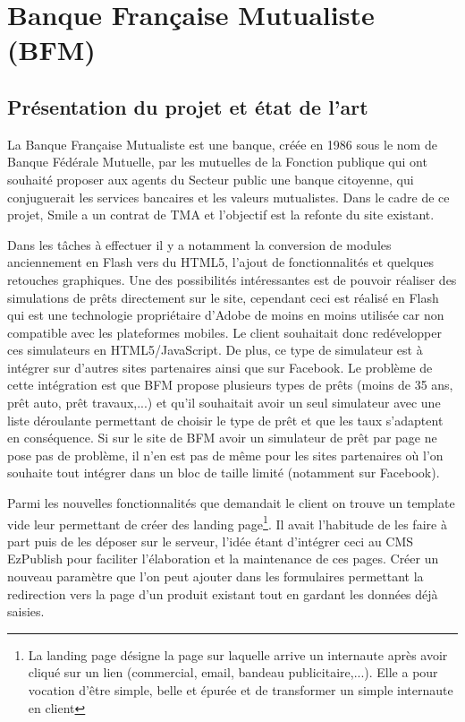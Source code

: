 \documentclass[a4paper,11pt,twoside]{report}
\begin{document}
\newpage
    
  \section{Banque Française Mutualiste (BFM)}
    \subsection*{Présentation du projet et état de l'art}
    La Banque Française Mutualiste est une banque, créée en 1986 sous le nom de Banque Fédérale Mutuelle, par les mutuelles de la Fonction publique qui ont souhaité proposer aux agents du Secteur public une banque citoyenne, qui conjuguerait les services bancaires et les valeurs mutualistes. Dans le cadre de ce projet, Smile a un contrat de TMA et l'objectif est la refonte du site existant. 
    
    Dans les tâches à effectuer il y a notamment la conversion de modules anciennement en Flash vers du HTML5, l'ajout de fonctionnalités et quelques retouches graphiques. Une des possibilités intéressantes est de pouvoir réaliser des simulations de prêts directement sur le site, cependant ceci est réalisé en Flash qui est une technologie propriétaire d'Adobe de moins en moins utilisée car non compatible avec les plateformes mobiles. Le client souhaitait donc redévelopper ces simulateurs en HTML5/JavaScript. De plus, ce type de simulateur est à intégrer sur d'autres sites partenaires ainsi que sur Facebook. Le problème de cette intégration est que BFM propose plusieurs types de prêts (moins de 35 ans, prêt auto, prêt travaux,...) et qu'il souhaitait avoir un seul simulateur avec une liste déroulante permettant de choisir le type de prêt et que les taux s'adaptent en conséquence. Si sur le site de BFM avoir un simulateur de prêt par page ne pose pas de problème, il n'en est pas de même pour les sites partenaires où l'on souhaite tout intégrer dans un bloc de taille limité (notamment sur Facebook). 
    
    Parmi les nouvelles fonctionnalités que demandait le client on trouve un template vide leur permettant de créer des landing page\footnote{La landing page désigne la page sur laquelle arrive un internaute après avoir cliqué sur un lien (commercial, email, bandeau publicitaire,...). Elle a pour vocation d'être simple, belle et épurée et de transformer un simple internaute en client}. Il avait l'habitude de les faire à part puis de les déposer sur le serveur, l'idée étant d'intégrer ceci au CMS EzPublish pour faciliter l'élaboration et la maintenance de ces pages. Créer un nouveau paramètre que l'on peut ajouter dans les formulaires permettant la redirection vers la page d'un produit existant tout en gardant les données déjà saisies. 
    
\end{document}
